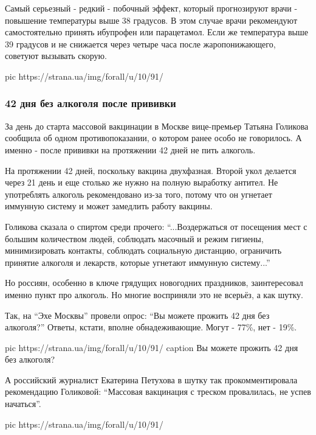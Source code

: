 {Самый серьезный - редкий - побочный эффект, который прогнозируют врачи -
повышение температуры выше 38 градусов. В этом случае врачи рекомендуют
самостоятельно принять ибупрофен или парацетамол. Если же температура выше 39
градусов и не снижается через четыре часа после жаропонижающего, советуют
вызывать скорую. 

\ifcmt
pic https://strana.ua/img/forall/u/10/91/%
\fi

\subsubsection{42 дня без алкоголя после прививки }

За день до старта массовой вакцинации в Москве вице-премьер Татьяна Голикова
сообщила об одном противопоказании, о котором ранее особо не говорилось. А
именно - после прививки на протяжении 42 дней не пить алкоголь. 

На протяжении 42 дней, поскольку вакцина двухфазная. Второй укол делается через
21 день и еще столько же нужно на полную выработку антител. Не употреблять
алкоголь рекомендовано из-за того, потому что он угнетает иммунную систему и
может замедлить работу вакцины. 

Голикова сказала о спиртом среди прочего: \enquote{...Воздержаться от посещения мест с
большим количеством людей, соблюдать масочный и режим гигиены, минимизировать
контакты, соблюдать социальную дистанцию, ограничить принятие алкоголя и
лекарств, которые угнетают иммунную систему...}

Но россиян, особенно в ключе грядущих новогодних праздников, заинтересовал
именно пункт про алкоголь. Но многие восприняли это не всерьёз, а как шутку.

Так, на \enquote{Эхе Москвы} провели опрос: \enquote{Вы можете прожить 42 дня без алкоголя?}
Ответы, кстати, вполне обнадеживающие. Могут - 77\%, нет - 19\%. 

\ifcmt
pic https://strana.ua/img/forall/u/10/91/%
caption Вы можете прожить 42 дня без алкоголя?
\fi

А российский журналист Екатерина Петухова в шутку так прокомментировала
рекомендацию Голиковой: \enquote{Массовая вакцинация с треском провалилась, не
успев начаться}. 

\ifcmt
pic https://strana.ua/img/forall/u/10/91/%
\fi

}
